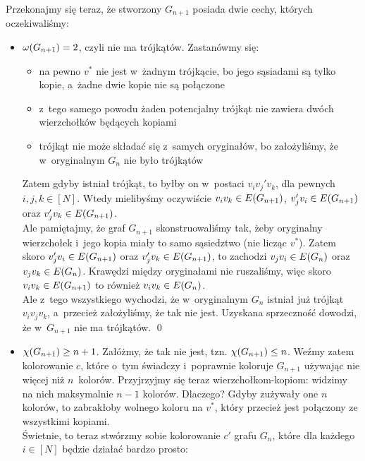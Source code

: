         Przekonajmy się teraz, że stworzony $G_{n + 1}$ posiada dwie cechy, których oczekiwaliśmy:
        \begin{itemize}
            \item $\omega\pars{G_{n + 1}} = 2$, czyli nie ma trójkątów. Zastanówmy się:
                \begin{itemize}
                    \item na pewno $v^\ast$ nie jest w~żadnym trójkącie, bo jego sąsiadami są tylko kopie, a~żadne dwie kopie nie są połączone
                    \item z~tego samego powodu żaden potencjalny trójkąt nie zawiera dwóch wierzchołków będących kopiami
                    \item trójkąt nie może składać się z~samych oryginałów, bo założyliśmy, że w~oryginalnym $G_n$ nie było trójkątów
                \end{itemize}
                Zatem gdyby istniał trójkąt, to byłby on w~postaci $v_iv_j'v_k$, dla pewnych $i, j, k \in [N]$. Wtedy mielibyśmy oczywiście $v_iv_k \in E\pars{G_{n + 1}}$, $v_j'v_i \in E\pars{G_{n + 1}}$ oraz $v_j'v_k \in E\pars{G_{n + 1}}$.\\
                Ale pamiętajmy, że graf $G_{n + 1}$ skonstruowaliśmy tak, żeby oryginalny wierzchołek i~jego kopia miały to samo sąsiedztwo (nie licząc $v^\ast$). Zatem skoro $v_j'v_i \in E\pars{G_{n + 1}}$ oraz $v_j'v_k \in E\pars{G_{n + 1}}$, to zachodzi $v_jv_i \in E\pars{G_n}$ oraz $v_jv_k \in E\pars{G_n}$. Krawędzi między oryginałami nie ruszaliśmy, więc skoro $v_iv_k \in E\pars{G_{n + 1}}$ to również $v_iv_k \in E\pars{G_n}$.\\
                Ale z~tego wszystkiego wychodzi, że w~oryginalnym $G_n$ istniał już trójkąt $v_iv_jv_k$, a~przecież założyliśmy, że tak nie jest. Uzyskana sprzeczność dowodzi, że w~$G_{n + 1}$ nie ma trójkątów.
                \qed
            \item $\chi\pars{G_{n + 1}} \geq n + 1$.
                Załóżmy, że tak nie jest, tzn. $\chi\pars{G_{n + 1}} \leq n$. Weźmy zatem kolorowanie $c$, które o~tym świadczy i~poprawnie koloruje $G_{n + 1}$ używając nie więcej niż $n$~kolorów. Przyjrzyjmy się teraz wierzchołkom-kopiom: widzimy na nich maksymalnie $n - 1$ kolorów. Dlaczego? Gdyby zużywały one $n$ kolorów, to zabrakłoby wolnego koloru na $v^\ast$, który przecież jest połączony ze wszystkimi kopiami.\\
                Świetnie, to teraz stwórzmy sobie kolorowanie $c'$ grafu $G_n$, które dla każdego $i \in [N]$ będzie działać bardzo prosto:

\end{itemize}
